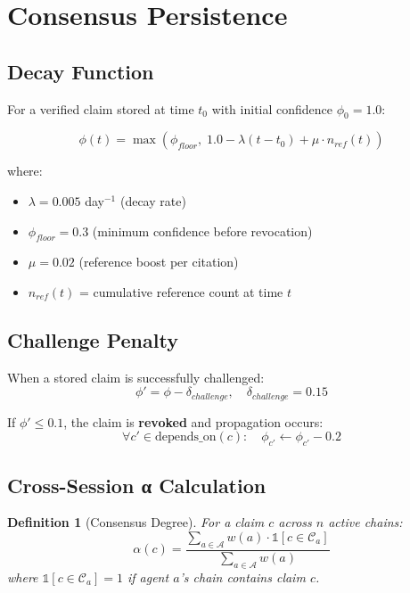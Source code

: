 \documentclass[11pt,a4paper]{article}
\newtheorem{definition}{Definition}
\begin{document}
\section{Consensus Persistence}

\subsection{Decay Function}

For a verified claim stored at time $t_0$ with initial confidence $\phi_0 = 1.0$:

$$\phi(t) = \max\left(\phi_{floor}, \; 1.0 - \lambda(t - t_0) + \mu \cdot n_{ref}(t)\right)$$

where:
\begin{itemize}
    \item $\lambda = 0.005$ day$^{-1}$ (decay rate)
    \item $\phi_{floor} = 0.3$ (minimum confidence before revocation)
    \item $\mu = 0.02$ (reference boost per citation)
    \item $n_{ref}(t)$ = cumulative reference count at time $t$
\end{itemize}

\subsection{Challenge Penalty}

When a stored claim is successfully challenged:
$$\phi' = \phi - \delta_{challenge}, \quad \delta_{challenge} = 0.15$$

If $\phi' \leq 0.1$, the claim is \textbf{revoked} and propagation occurs:
$$\forall c' \in \text{depends\_on}(c): \quad \phi_{c'} \leftarrow \phi_{c'} - 0.2$$

\subsection{Cross-Session α Calculation}

\begin{definition}[Consensus Degree]
For a claim $c$ across $n$ active chains:
$$\alpha(c) = \frac{\sum_{a \in \mathcal{A}} w(a) \cdot \mathbb{1}[c \in \mathcal{C}_a]}{\sum_{a \in \mathcal{A}} w(a)}$$
where $\mathbb{1}[c \in \mathcal{C}_a] = 1$ if agent $a$'s chain contains claim $c$.
\end{definition}
\end{document}
